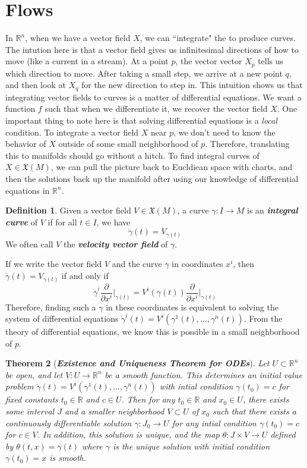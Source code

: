 \documentclass[psamsfonts]{amsart}
\newtheorem{thm}{Theorem}[section]
\theoremstyle{definition}
\newtheorem{defn}[thm]{Definition}
\theoremstyle{remark}
\newcommand{\R}{\mathbb{R}}
\newcommand{\ib}[1]{\textbf{\textit{#1}}}
\begin{document}
\section{Flows}
%
In $\R^n$, when we have a vector field $X$, we can ``integrate" the to produce
curves. The intution here is that a vector field gives us infinitesimal directions
of how to move (like a current in a stream). At a point $p$, the vector
vector $X_p$ tells us which direction to move. After taking a small step, we
arrive at a new point $q$, and then look at $X_q$ for the new direction to step
in. This intuition shows us that integrating vector fields to curves is a
matter of differential equations. We want a function $f$ such that
when we differentiate it, we recover the vector field $X$. One important
thing to note here is that solving differential equations is a \emph{local}
condition. To integrate a vector field $X$ near $p$, we don't need
to know the behavior of $X$ outside of some small neighborhood of $p$. Therefore,
translating this to manifolds should go without a hitch. To find integral curves
of $X \in \mathfrak{X}(M)$, we can pull the picture back to Eucldiean space
with charts, and then the solutions back up the manifold after using our
knowledge of differential equations in $\R^n$.
%
\begin{defn}
Given a vector field $V \in \mathfrak{X}(M)$, a curve $\gamma : I \to M$
is an \ib{integral curve} of $V$ if for all $t \in I$, we have
\[
\dot{\gamma}(t) = V_{\gamma(t)}
\]
We often call $V$ the \ib{velocity vector field} of $\gamma$.
\end{defn}
%
If we write the vector field $V$ and the curve $\gamma$ in coordinates $x^i$,
then $\dot{\gamma}(t) = V_{\gamma(t)}$ if and only if
\[
\dot{\gamma}^i \frac{\partial}{\partial x^i}\bigg\vert_{\gamma(t)} =
V^i(\gamma(t)) \frac{\partial}{\partial x^i}\bigg\vert_{\gamma(t)}
\]
Therefore, finding such a $\gamma$ in these coordinates is equivalent to
solving the system of differential equations $\dot{\gamma}^i(t) =
V^i(\gamma^1(t), \ldots, \gamma^n(t))$.
%
From the theory of differential equations, we know this is possible in a
small neighborhood of $p$.
%
\begin{thm}[\ib{Existence and Uniqueness Theorem for ODEs}]
Let $U \subset \R^n$ be open, and let $V : U \to \R^n$ be a smooth function.
This determines an initial value problem $\dot{\gamma}(t) =
V^i(\gamma^1(t), \ldots, \gamma^n(t))$ with intial condition $\gamma(t_0) = c$
for fixed constants $t_0 \in \R$ and $c \in U$. Then for any $t_0 \in \R$ and
$x_0 \in U$, there exists some interval $J$ and a smaller neighborhood $V \subset U$
of $x_0$ such that there exists a continuously differentiable solution
$\gamma : J_0 \to U$ for any intial condition $\gamma(t_0) = c$ for $c \in V$.
In addition, this solution is unique, and the map $\theta : J \times V \to U$
defined by $\theta(t,x) = \gamma(t)$ where $\gamma$ is the unique solution with
initial condition $\gamma(t_0) = x$ is smooth.
\end{thm}
\end{document}
